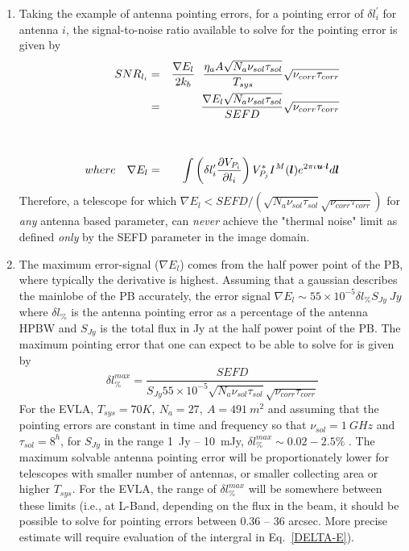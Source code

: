 \documentclass[11pt]{article}
\def\vec#1{\ensuremath{\mathchoice{\mbox{\boldmath$\displaystyle#1$}}
{\mbox{\boldmath$\textstyle#1$}}
{\mbox{\boldmath$\scriptstyle#1$}}
{\mbox{\boldmath$\scriptscriptstyle#1$}}}}
\begin{document}
\begin{enumerate}
\item Taking the example of antenna pointing errors, for a pointing
  error of $\delta l^\prime_i$ for antenna $i$, the signal-to-noise ratio
  available to solve for the pointing error is given by
\begin{eqnarray}
  SNR_{l_i} &=& \frac{\nabla E_l}{2 k_b}~~ \frac{\eta_a
    A \sqrt{N_a \nu_{sol} \tau_{sol}}}{T_{sys}}\sqrt{\nu_{corr}\tau_{corr}}\\ 
  &=& \frac{\nabla E_l \sqrt{N_a\nu_{sol}\tau_{sol}}}{SEFD}\sqrt{\nu_{corr}\tau_{corr}}\\\nonumber
  \\ \nonumber
  \\ 
  \label{DELTA-E}
  where~~~\nabla E_l &=& \int \left(\delta l^\prime_i \frac{\partial
      V_{P_i}}{\partial l_i}\right) V^*_{P_j} I^M(\vec{l}) e^{2\pi
    \iota \vec{u}\cdot \vec{l}} d\vec{l}
\end{eqnarray}
Therefore, a telescope for which $\nabla E_l < SEFD/\left(\sqrt{N_a\nu_{sol}\tau_{sol}}\sqrt{\nu_{corr}\tau_{corr}}\right)$ for
{\it any} antenna based parameter, can {\it never} achieve the
"thermal noise" limit as defined {\it only} by the SEFD parameter in
the image domain.

\item The maximum error-signal ($\nabla E_l$) comes from the half
  power point of the PB, where typically the derivative is highest.
  Assuming that a gaussian describes the mainlobe of the PB
  accurately, the error signal $\nabla E_l \sim 55\times 10^{-5} \delta l_{\%}
  S_{Jy} ~Jy$ where $\delta l_\%$ is the antenna pointing error as
  a percentage of the antenna HPBW and $S_{Jy}$ is the total flux in
  Jy at the half power point of the PB.  The maximum pointing error
  that one can expect to be able to solve for is given by 
\begin{equation}
  \delta l^{max}_\% = \frac{SEFD}{S_{Jy} 55\times 10^{-5}\sqrt{N_a \nu_{sol} \tau_{sol}}\sqrt{\nu_{corr}\tau_{corr}}}
\end{equation}
For the EVLA, $T_{sys} = 70K,~N_a=27,~A=491~m^2$ and assuming that the
pointing errors are constant in time and frequency so that
$\nu_{sol}=1~GHz$ and $\tau_{sol} = 8^h$, for $S_{Jy}$ in the range
1~Jy -- 10~mJy, $\delta l^{max}_\% \sim 0.02 - 2.5\%$ .  The maximum
solvable antenna pointing error will be proportionately lower for
telescopes with smaller number of antennas, or smaller collecting area
or higher $T_{sys}$.  For the EVLA, the range of $\delta l^{max}_\%$
will be somewhere between these limits (i.e., at L-Band, depending on
the flux in the beam, it should be possible to solve for pointing
errors between 0.36 -- 36 arcsec.  More precise estimate will require
evaluation of the intergral in Eq.~\ref{DELTA-E}).



\end{enumerate}
\end{document}
